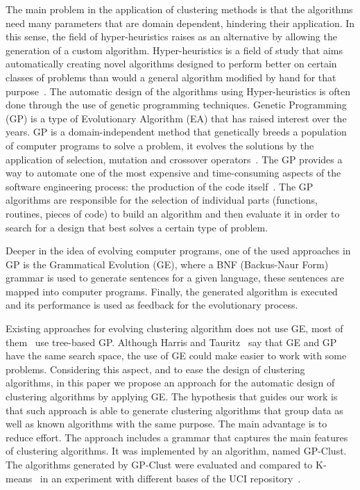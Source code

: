\documentclass[conference]{IEEEtran}
\begin{document}
	
	The main problem in the application of clustering methods is that the algorithms need many parameters that are domain dependent, hindering their application. In this sense, the field of hyper-heuristics raises as an alternative by allowing the generation of a custom algorithm. Hyper-heuristics is a field of study that aims automatically creating novel algorithms designed to perform better on certain classes of problems than would a general algorithm modified by hand for that purpose~\cite{harris2015comparison}. The automatic design of the algorithms using Hyper-heuristics is  often done through the use of genetic programming techniques. Genetic Programming (GP) is a type of Evolutionary Algorithm (EA) that has raised interest over the years. GP is a domain-independent method that genetically breeds a population of computer programs to solve a problem, it evolves the solutions by the application of selection, mutation and crossover operators~\cite{poli2014genetic}. The GP provides a way to automate one of the most expensive and time-consuming aspects of the software engineering process: the production of the code itself~\cite{langdon2015optimising}. The GP algorithms are responsible for the selection of individual parts (functions, routines, pieces of code) to build an algorithm and then evaluate it in order to search for a design that best solves a certain type of problem.
	
	
	Deeper in the idea of evolving computer programs, one of the used approaches in GP is the Grammatical Evolution (GE), where a BNF (Backus-Naur Form) grammar is used to generate sentences for a given language, these sentences are mapped into  computer programs. Finally, the generated algorithm is executed and its performance is used as feedback for the evolutionary process.
	
	
	Existing approaches for evolving clustering algorithm does not use GE, most of them~\cite{ahn2011genetic, boric2007genetic, xie2006population} use tree-based GP. Although Harris and Tauritz~\cite{harris2015comparison} say that GE and GP have the same search space,  the use of GE could make easier to work with some problems. Considering this aspect, and to ease the design of clustering algorithms, in this paper we propose an approach for the automatic design of clustering algorithms by applying GE. The hypothesis that guides our work is that such approach is able to generate clustering algorithms that group data as well as known algorithms with the same purpose. The main advantage is to reduce effort. The approach includes a grammar that captures the main features of  clustering algorithms. It was implemented by an algorithm, named GP-Clust. The algorithms generated by GP-Clust were evaluated and compared to K-means~\cite{kanungo2002efficient} in an experiment with different bases of the UCI repository~\cite{uci}. 
	
\end{document}
